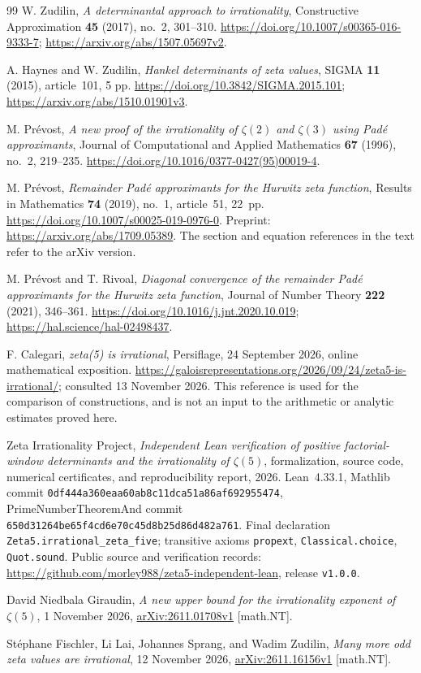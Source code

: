 \documentclass[11pt,letterpaper]{article}
\theoremstyle{definition}
\begin{document}
\begin{thebibliography}{99}
W. Zudilin, \emph{A determinantal approach to irrationality},
Constructive Approximation \textbf{45} (2017), no.~2, 301--310.
\url{https://doi.org/10.1007/s00365-016-9333-7};
\url{https://arxiv.org/abs/1507.05697v2}.

A. Haynes and W. Zudilin, \emph{Hankel determinants of zeta values},
SIGMA \textbf{11} (2015), article~101, 5 pp.
\url{https://doi.org/10.3842/SIGMA.2015.101};
\url{https://arxiv.org/abs/1510.01901v3}.

M. Pr\'evost, \emph{A new proof of the irrationality of $\zeta(2)$ and
$\zeta(3)$ using Pad\'e approximants}, Journal of Computational and Applied
Mathematics \textbf{67} (1996), no.~2, 219--235.
\url{https://doi.org/10.1016/0377-0427(95)00019-4}.

M. Pr\'evost, \emph{Remainder Pad\'e approximants for the Hurwitz zeta
function}, Results in Mathematics \textbf{74} (2019), no.~1, article~51,
22~pp. \url{https://doi.org/10.1007/s00025-019-0976-0}.
Preprint: \url{https://arxiv.org/abs/1709.05389}.
The section and equation references in the text refer to the arXiv version.

M. Pr\'evost and T. Rivoal, \emph{Diagonal convergence of the remainder
Pad\'e approximants for the Hurwitz zeta function}, Journal of Number
Theory \textbf{222} (2021), 346--361.
\url{https://doi.org/10.1016/j.jnt.2020.10.019};
\url{https://hal.science/hal-02498437}.

F. Calegari, \emph{zeta(5) is irrational}, Persiflage,
24 September 2026, online mathematical exposition.
\url{https://galoisrepresentations.org/2026/09/24/zeta5-is-irrational/};
consulted 13 November 2026.
This reference is used for the comparison of constructions, and is not an input to the arithmetic or analytic estimates proved here.

Zeta Irrationality Project,
\emph{Independent Lean verification of positive
	factorial-window determinants and the irrationality of
	$\zeta(5)$},
formalization, source code, numerical certificates, and
reproducibility report, 2026.
Lean~4.33.1, Mathlib commit
\texttt{0df444a360eaa60ab8c11dca51a86af692955474},
PrimeNumberTheoremAnd commit
\texttt{650d31264be65f4cd6e70c45d8b25d86d482a761}.
Final declaration
\texttt{Zeta5.irrational\_zeta\_five};
transitive axioms
\texttt{propext}, \texttt{Classical.choice},
\texttt{Quot.sound}.
Public source and verification records:
\url{https://github.com/morley988/zeta5-independent-lean},
release \texttt{v1.0.0}.

David Niedbala Giraudin, \emph{A new upper bound for the irrationality
exponent of $\zeta(5)$}, 1 November 2026,
\href{https://arxiv.org/abs/2611.01708v1}{arXiv:2611.01708v1} [math.NT].

St\'ephane Fischler, Li Lai, Johannes Sprang, and Wadim Zudilin,
\emph{Many more odd zeta values are irrational}, 12 November 2026,
\href{https://arxiv.org/abs/2611.16156v1}{arXiv:2611.16156v1} [math.NT].

\end{thebibliography}
\endgroup
\end{document}
